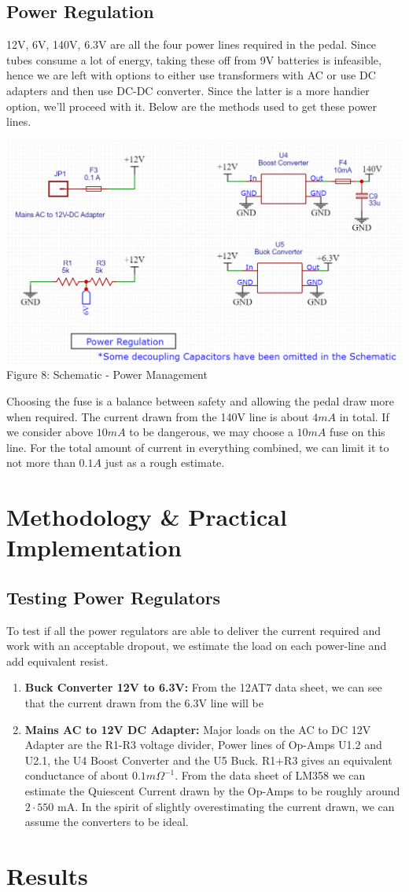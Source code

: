 \documentclass[11pt]{article}
\newcommand{\tab}{\hspace*{6mm}}
\begin{document}
\subsection{Power Regulation}
\tab 12V, 6V, 140V, 6.3V are all the four power lines required in the pedal. Since tubes consume a lot of energy, taking these off from 9V batteries is infeasible, hence we are left with options to either use transformers with AC or use DC adapters and then use DC-DC converter. Since the latter is a more handier option, we'll proceed with it. Below are the methods used to get these power lines. 
\begin{center}\includegraphics[width=\textwidth]{Documentation LaTeX/sch_power.png}\\\small{Figure 8: Schematic - Power Management}\end{center}
\tab Choosing the fuse is a balance between safety and allowing the pedal draw more when required. The current drawn from the 140V line is about $4 mA$ in total. If we consider above $10 mA$ to be dangerous, we may choose a $10 mA$ fuse on this line. For the total amount of current in everything combined, we can limit it to not more than $0.1A$ just as a rough estimate.  
    \section{Methodology \& Practical Implementation}
    \subsection{Testing Power Regulators}
    To test if all the power regulators are able to deliver the current required and work with an acceptable dropout, we estimate the load on each power-line and add equivalent resist.
    \begin{enumerate}
    \item \textbf{Buck Converter 12V to 6.3V:} From the 12AT7 data sheet, we can see that the current drawn from the 6.3V line will be 
        \item \textbf{Mains AC to 12V DC Adapter:} Major loads on the AC to DC 12V Adapter are the R1-R3 voltage divider, Power lines of Op-Amps U1.2 and U2.1, the U4 Boost Converter and the U5 Buck. R1+R3 gives an equivalent conductance of about $0.1 m\Omega^{-1}$. From the data sheet of LM358 we can estimate the Quiescent Current drawn by the Op-Amps to be roughly around $2\cdot550$ mA. In the spirit of slightly overestimating the current drawn, we can assume the converters to be ideal. 
    \end{enumerate}
    \section{Results}
\end{document}
